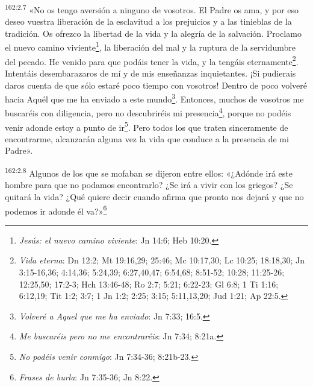 \par 
\textsuperscript{162:2.7} «No os tengo aversión a ninguno de vosotros. El Padre os ama, y por eso deseo vuestra liberación de la esclavitud a los prejuicios y a las tinieblas de la tradición. Os ofrezco la libertad de la vida y la alegría de la salvación. Proclamo el nuevo camino viviente\footnote{\textit{Jesús: el nuevo camino viviente}: Jn 14:6; Heb 10:20.}, la liberación del mal y la ruptura de la servidumbre del pecado. He venido para que podáis tener la vida, y la tengáis eternamente\footnote{\textit{Vida eterna}: Dn 12:2; Mt 19:16,29; 25:46; Mc 10:17,30; Lc 10:25; 18:18,30; Jn 3:15-16,36; 4:14,36; 5:24,39; 6:27,40,47; 6:54,68; 8:51-52; 10:28; 11:25-26; 12:25,50; 17:2-3; Hch 13:46-48; Ro 2:7; 5:21; 6:22-23; Gl 6:8; 1 Ti 1:16; 6:12,19; Tit 1:2; 3:7; 1 Jn 1:2; 2:25; 3:15; 5:11,13,20; Jud 1:21; Ap 22:5.}. Intentáis desembarazaros de mí y de mis enseñanzas inquietantes. ¡Si pudierais daros cuenta de que sólo estaré poco tiempo con vosotros! Dentro de poco volveré hacia Aquél que me ha enviado a este mundo\footnote{\textit{Volveré a Aquel que me ha enviado}: Jn 7:33; 16:5.}. Entonces, muchos de vosotros me buscaréis con diligencia, pero no descubriréis mi presencia\footnote{\textit{Me buscaréis pero no me encontraréis}: Jn 7:34; 8:21a.}, porque no podéis venir adonde estoy a punto de ir\footnote{\textit{No podéis venir conmigo}: Jn 7:34-36; 8:21b-23.}. Pero todos los que traten sinceramente de encontrarme, alcanzarán alguna vez la vida que conduce a la presencia de mi Padre».

\par 
\textsuperscript{162:2.8} Algunos de los que se mofaban se dijeron entre ellos: «¿Adónde irá este hombre para que no podamos encontrarlo? ¿Se irá a vivir con los griegos? ¿Se quitará la vida? ¿Qué quiere decir cuando afirma que pronto nos dejará y que no podemos ir adonde él va?»\footnote{\textit{Frases de burla}: Jn 7:35-36; Jn 8:22.}

